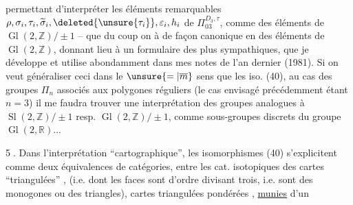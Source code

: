 permettant d'interpréter les éléments remarquables $\rho,\sigma_i,\tau_i,\widetilde\sigma_i,\deleted{\unsure{\tau_i}},\varepsilon_i,h_i$ de $\Pi_{03}^{D_3,\tau}$, comme des éléments de $\operatorname{Gl}(2,\mathbb Z)/\pm1$ -- que du coup on  à  de façon canonique en des éléments de $\operatorname{Gl}(2,\mathbb Z)$, donnant lieu à un formulaire des plus sympathiques, que je développe et utilise abondamment dans mes notes de l'an dernier (1981). Si on veut généraliser ceci dans le $\unsure{=|\overline m}$ sens que les iso. (40), au cas des groupes  $\Pi_n$  associés aux polygones réguliers (le cas envisagé précédemment étant $n=3$) il me faudra trouver une interprétation des groupes analogues à $\operatorname{Sl}(2,\mathbb Z)/\pm1$ resp. $\operatorname{Gl}(2,\mathbb Z)/\pm1$, comme sous-groupes discrets  du groupe $\operatorname{Gl}(2,\mathbb R)$...

\textcircled{5.} Dans l'interprétation ``cartographique'', les isomorphismes (40) s'explicitent comme deux équivalences de catégories, entre les cat. isotopiques des cartes ``triangulées'' , (i.e. dont  les faces sont d'ordre divisant trois, i.e. sont des monogones ou des triangles),  cartes  triangulées pondérées , \uline{munies} d'un
